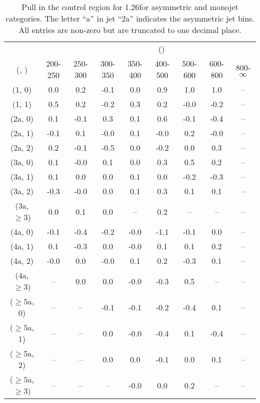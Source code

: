 \begin{table}[h!]
\tiny
\centering
\caption{Pull in the \mj control region for 1.26\ifb for asymmetric and monojet categories. The letter ``a'' in jet \eg ``2a''  indicates the asymmetric jet bins. All entries are non-zero but are truncated to one decimal place.\label{tab:pullsep_mu_ewk_asym}}
\begin{tabular}
{ccccccccc}
	\hline\hline
&	& \multicolumn{8}{c}{\scalht (\gev)} \\ 
	 (\njet,  \nb) & 200-250 & 250-300 & 300-350 & 350-400 & 400-500 & 500-600 & 600-800 & 800-$\infty$ \\ [0.8ex] 
\hline
	(1, 0) & 0.0 & 0.2 & -0.1 & 0.0 & 0.9 & 1.0 & 1.0 & -- \\[0.5ex] 
	(1, 1) & 0.5 & 0.2 & -0.2 & 0.3 & 0.2 & -0.0 & -0.2 & -- \\[0.5ex] 
	(2a, 0) & 0.1 & -0.1 & 0.3 & 0.1 & 0.6 & -0.1 & -0.4 & -- \\[0.5ex] 
	(2a, 1) & -0.1 & 0.1 & -0.0 & 0.1 & -0.0 & 0.2 & -0.0 & -- \\[0.5ex] 
	(2a, 2) & 0.2 & -0.1 & -0.5 & 0.0 & -0.2 & 0.0 & 0.3 & -- \\[0.5ex] 
	(3a, 0) & 0.1 & -0.0 & 0.1 & 0.0 & 0.3 & 0.5 & 0.2 & -- \\[0.5ex] 
	(3a, 1) & 0.1 & 0.0 & 0.0 & 0.1 & 0.0 & -0.2 & -0.3 & -- \\[0.5ex] 
	(3a, 2) & -0.3 & -0.0 & 0.0 & 0.1 & 0.3 & 0.1 & 0.1 & -- \\[0.5ex] 
	(3a, $\ge3$) & 0.0 & 0.1 & 0.0 & -- & 0.2 & -- & -- & -- \\[0.5ex] 
	(4a, 0) & -0.1 & -0.4 & -0.2 & -0.0 & -1.1 & -0.1 & 0.0 & -- \\[0.5ex] 
	(4a, 1) & 0.1 & -0.3 & 0.0 & -0.0 & 0.1 & 0.1 & 0.2 & -- \\[0.5ex] 
	(4a, 2) & -0.0 & 0.0 & -0.0 & 0.1 & 0.2 & -0.3 & 0.1 & -- \\[0.5ex] 
	(4a, $\ge3$) & -- & 0.0 & 0.0 & -0.0 & -0.3 & 0.5 & -- & -- \\[0.5ex] 
	($\ge5$a, 0) & -- & -- & -0.1 & -0.1 & -0.2 & -0.4 & 0.1 & -- \\[0.5ex] 
	($\ge5$a, 1) & -- & -- & 0.0 & -0.0 & -0.4 & 0.1 & -0.4 & -- \\[0.5ex] 
	($\ge5$a, 2) & -- & -- & 0.0 & 0.0 & -0.1 & 0.0 & 0.1 & -- \\[0.5ex] 
	($\ge5$a, $\ge3$) & -- & -- & -- & -0.0 & 0.0 & 0.2 & -- & -- \\[0.5ex] 
	\hline
	\hline
\end{tabular}
\end{table}
